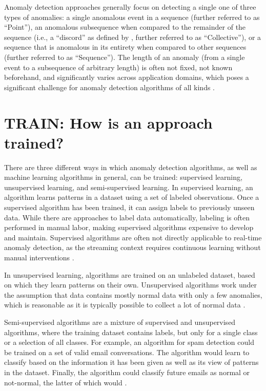 Anomaly detection approaches generally focus on detecting a single one of three types of anomalies: a single anomalous event in a sequence (further referred to as ``Point''), an anomalous subsequence when compared to the remainder of the sequence (i.e., a ``discord'' as defined by \citet{keogh_hot_2005}, further referred to as ``Collective''), or a sequence that is anomalous in its entirety when compared to other sequences (further referred to as ``Sequence''). The length of an anomaly (from a single event to a subsequence of arbitrary length) is often not fixed, not known beforehand, and significantly varies across application domains, which poses a significant challenge for anomaly detection algorithms of all kinds \citep{chandola_anomaly_2012}.


\section{TRAIN: How is an approach trained?}
There are three different ways in which anomaly detection algorithms, as well as machine learning algorithms in general, can be trained: supervised learning, unsupervised learning, and semi-supervised learning. In supervised learning, an algorithm learns patterns in a dataset using a set of labeled observations. Once a supervised algorithm has been trained, it can assign labels to previously unseen data. While there are approaches to label data automatically, labeling is often performed in manual labor, making supervised algorithms expensive to develop and maintain. Supervised algorithms are often not directly applicable to real-time anomaly detection, as the streaming context requires continuous learning without manual interventions \citep{ahmad_unsupervised_2017}.

In unsupervised learning, algorithms are trained on an unlabeled dataset, based on which they learn patterns on their own. Unsupervised algorithms work under the assumption that data contains mostly normal data with only a few anomalies, which is reasonable as it is typically possible to collect a lot of normal data \citep{schneider_expected_2016}.

Semi-supervised algorithms are a mixture of supervised and unsupervised algorithms, where the training dataset contains labels, but only for a single class or a selection of all classes. For example, an algorithm for spam detection could be trained on a set of valid email conversations. The algorithm would learn to classify based on the information it has been given as well as its view of patterns in the dataset. Finally, the algorithm could classify future emails as normal or not-normal, the latter of which would  \citep{wang_statistical_2013}.

